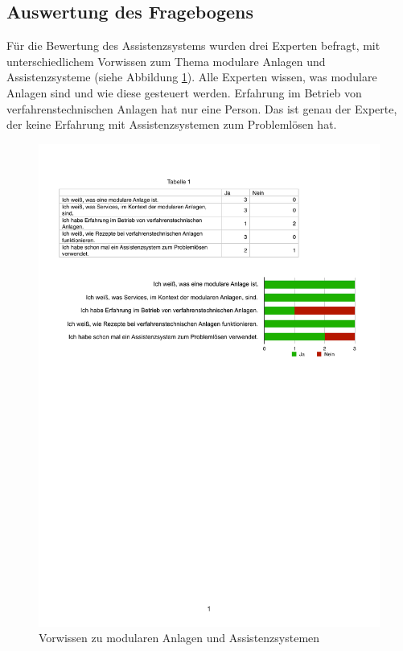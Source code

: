 \subsection{Auswertung des Fragebogens}
Für die Bewertung des Assistenzsystems wurden drei Experten befragt, mit unterschiedlichem Vorwissen zum Thema modulare Anlagen und Assistenzsysteme (siehe Abbildung \ref{pic:Fragebogen-Vorwissen}). Alle Experten wissen, was modulare Anlagen sind und wie diese gesteuert werden. Erfahrung im Betrieb von verfahrenstechnischen Anlagen hat nur eine Person. Das ist genau der Experte, der keine Erfahrung mit Assistenzsystemen zum Problemlösen hat.
\begin{figure}[htbp]
\centering
\includegraphics[scale=0.65]{DA_files/Bilder/Validierung/Bild-Vorwissen.pdf}
\caption{Vorwissen zu modularen Anlagen und Assistenzsystemen}
\label{pic:Fragebogen-Vorwissen}
\end{figure}


